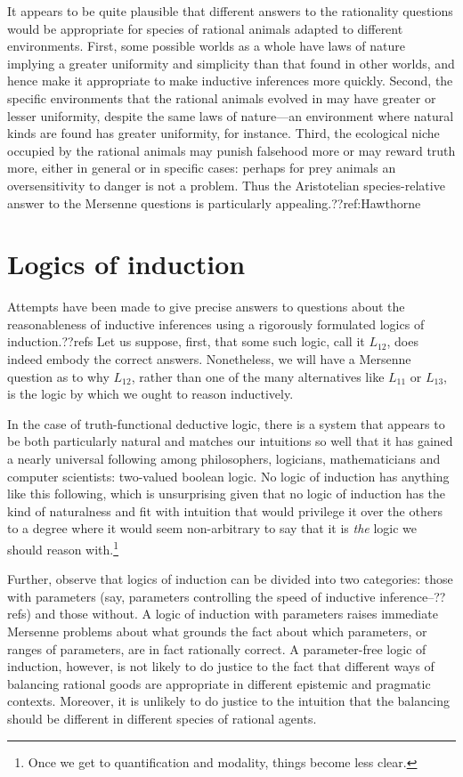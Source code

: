 It appears to be quite plausible that different answers to the rationality questions would be appropriate
for species of rational animals adapted to different environments. First, some possible worlds as a whole have 
laws of nature implying a greater uniformity and simplicity than that found in other worlds, and hence make it appropriate to make 
inductive inferences more quickly. Second, the specific environments that the rational animals evolved in may have greater or 
lesser uniformity, despite the same laws of nature---an environment where natural kinds are found has greater uniformity,
for instance. Third, the ecological niche occupied by the rational animals may
punish falsehood more or may reward truth more, either in general or in specific cases: perhaps for prey animals 
an oversensitivity to danger is not a problem. Thus the Aristotelian 
species-relative answer to the Mersenne questions is particularly appealing.??ref:Hawthorne

\section{Logics of induction}
Attempts have been made to give precise answers to questions about the reasonableness of inductive 
inferences using a rigorously formulated logics of induction.??refs Let us suppose, first, that some such
logic, call it $L_{12}$, does indeed embody the correct answers. Nonetheless, we will have a Mersenne question
as to why $L_{12}$, rather than one of the many alternatives like $L_{11}$ or $L_{13}$, is the logic by which we ought to reason 
inductively. 

In the case of truth-functional deductive logic, there is a system that appears to be both particularly natural and matches
our intuitions so well that it has gained a nearly universal following among philosophers, logicians, mathematicians
and computer scientists: two-valued boolean logic. No logic of induction has anything
like this following, which is unsurprising given that no logic of induction has the kind
of naturalness and fit with intuition that would privilege it over the others to a degree where it would seem
non-arbitrary to say that it is \textit{the} logic we should reason with.\footnote{Once we get to quantification
and modality, things become less clear.}

Further, observe that logics of induction can be divided into two categories: those with parameters (say, 
parameters controlling the speed of inductive inference--??refs) and those without. 
A logic of induction with parameters raises immediate Mersenne problems about what grounds the fact about which 
parameters, or ranges of parameters, are in fact rationally correct. 
A parameter-free logic of induction, however, is not likely to do justice to the fact that different ways of balancing
rational goods are appropriate in different epistemic and pragmatic contexts. Moreover, it is unlikely to do justice
to the intuition that the balancing should be different in different species of rational agents.

